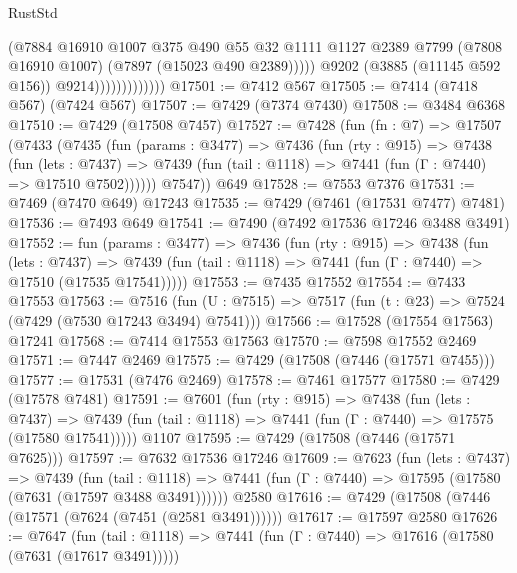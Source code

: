 \begin{lexlean}{RustStd}
\begin{coremodule}
                                  (@7884
                                    @16910
                                    @1007
                                    @375
                                    @490
                                    @55
                                    @32
                                    @1111
                                    @1127
                                    @2389
                                    @7799
                                    (@7808 @16910 @1007)
                                    (@7897 (@15023 @490 @2389)))))
                              @9202
                              (@3885 (@11145 @592 @156))
                              @9214)))))))))))))
@17501 := @7412 @567
@17505 := @7414 (@7418 @567) (@7424 @567)
@17507 := @7429 (@7374 @7430)
@17508 := @3484 @6368
@17510 := @7429 (@17508 @7457)
@17527 := @7428
    (fun (fn : @7) =>
    @17507
      (@7433
        (@7435
          (fun (params : @3477) =>
          @7436
            (fun (rty : @915) =>
            @7438
              (fun (lets : @7437) =>
              @7439 (fun (tail : @1118) => @7441 (fun (Γ : @7440) => @17510 @7502))))))
        @7547))
    @649
@17528 := @7553 @7376
@17531 := @7469 (@7470 @649) @17243
@17535 := @7429 (@7461 (@17531 @7477) @7481)
@17536 := @7493 @649
@17541 := @7490 (@7492 @17536 @17246 @3488 @3491)
@17552 := fun (params : @3477) =>
  @7436
    (fun (rty : @915) =>
    @7438
      (fun (lets : @7437) =>
      @7439 (fun (tail : @1118) => @7441 (fun (Γ : @7440) => @17510 (@17535 @17541)))))
@17553 := @7435 @17552
@17554 := @7433 @17553
@17563 := @7516
    (fun (U : @7515) => @7517 (fun (t : @23) => @7524 (@7429 (@7530 @17243 @3494) @7541)))
@17566 := @17528 (@17554 @17563) @17241
@17568 := @7414 @17553 @17563
@17570 := @7598 @17552 @2469
@17571 := @7447 @2469
@17575 := @7429 (@17508 (@7446 (@17571 @7455)))
@17577 := @17531 (@7476 @2469)
@17578 := @7461 @17577
@17580 := @7429 (@17578 @7481)
@17591 := @7601
    (fun (rty : @915) =>
    @7438
      (fun (lets : @7437) =>
      @7439 (fun (tail : @1118) => @7441 (fun (Γ : @7440) => @17575 (@17580 @17541)))))
    @1107
@17595 := @7429 (@17508 (@7446 (@17571 @7625)))
@17597 := @7632 @17536 @17246
@17609 := @7623
    (fun (lets : @7437) =>
    @7439
      (fun (tail : @1118) =>
      @7441 (fun (Γ : @7440) => @17595 (@17580 (@7631 (@17597 @3488 @3491))))))
    @2580
@17616 := @7429 (@17508 (@7446 (@17571 (@7624 (@7451 (@2581 @3491))))))
@17617 := @17597 @2580
@17626 := @7647
    (fun (tail : @1118) => @7441 (fun (Γ : @7440) => @17616 (@17580 (@7631 (@17617 @3491)))))

\end{coremodule}
\end{lexlean}
